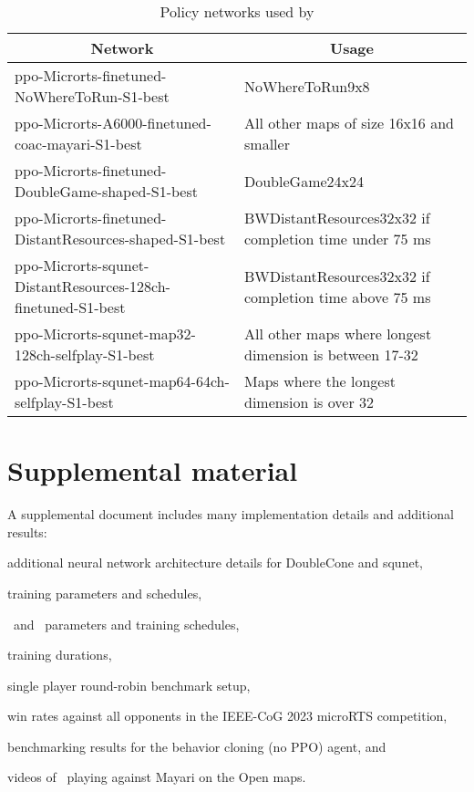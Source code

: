 \documentclass[conference]{IEEEtran}
\begin{document}
\begin{table}[t]
    \caption{Policy networks used by \agentName}
    \label{tab:policy-networks}
    \begin{center}
        \begin{tabular}{p{0.5\linewidth}p{0.5\linewidth}}
            \multicolumn{1}{c}{\bf Network}  &\multicolumn{1}{c}{\bf Usage} \\
            \midrule
            ppo-Microrts-finetuned-NoWhereToRun-S1-best & NoWhereToRun9x8 \\ \hline
            ppo-Microrts-A6000-finetuned-coac-mayari-S1-best & All other maps of size 16x16 and smaller \\ \hline
            ppo-Microrts-finetuned-DoubleGame-shaped-S1-best & DoubleGame24x24 \\ \hline
            ppo-Microrts-finetuned-DistantResources-shaped-S1-best & BWDistantResources32x32 if completion time under 75 ms \\ \hline
            ppo-Microrts-squnet-DistantResources-128ch-finetuned-S1-best & BWDistantResources32x32 if completion time above 75 ms \\ \hline
            ppo-Microrts-squnet-map32-128ch-selfplay-S1-best & All other maps where longest dimension is between 17-32 \\ \hline
            ppo-Microrts-squnet-map64-64ch-selfplay-S1-best & Maps where the longest
            dimension is over 32 \\
        \end{tabular}
    \end{center}
\end{table}

\section{Supplemental material}
A supplemental document includes many implementation details and additional results:
\begin{inparaenum}[(1)]
    \item additional neural network architecture details for DoubleCone and squnet,
    \item training parameters and schedules,
    \item \bcAgent\ and \bcPPOAgent\ parameters and training schedules,
    \item training durations,
    \item single player round-robin benchmark setup,
    \item win rates against all opponents in the IEEE-CoG 2023 microRTS competition,
    \item benchmarking results for the behavior cloning (no PPO) agent, and
    \item videos of \agentName\ playing against Mayari on the Open maps.
\end{inparaenum}
\end{document}
